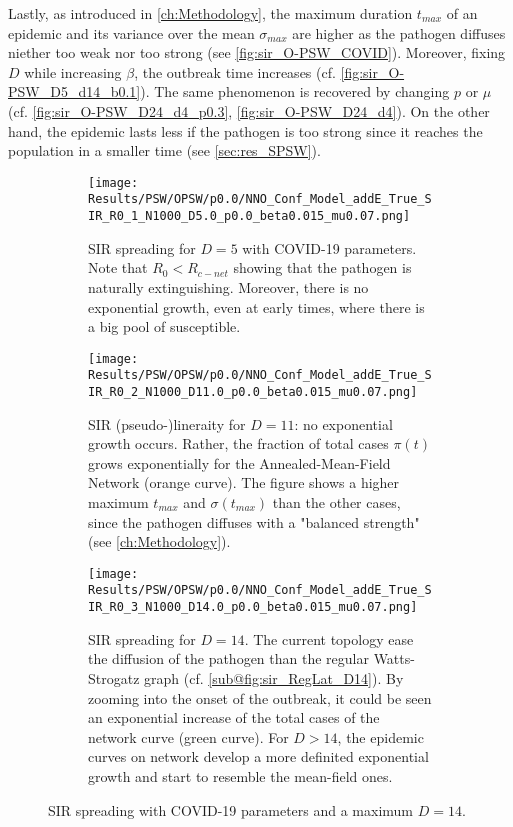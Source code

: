 \documentclass[a4paper,10pt,twoside]{book} %
\theoremstyle{definition}
\begin{document}
Lastly, as introduced in \autoref{ch:Methodology}, the maximum duration $t_{max}$ of an epidemic and its variance over the mean $\sigma_{max}$ are higher as the pathogen diffuses niether too weak nor too strong (see \autoref{fig:sir_O-PSW_COVID}). Moreover, fixing $D$ while increasing $ \beta$, the outbreak time increases (cf. \autoref{fig:sir_O-PSW_D5_d14_b0.1}). The same phenomenon is recovered by changing $ p$ or $ \mu$  (cf. \autoref{fig:sir_O-PSW_D24_d4_p0.3}, \autoref{fig:sir_O-PSW_D24_d4}). 
On the other hand, the epidemic lasts less if the pathogen is too strong since it reaches the population in a smaller time (see \autoref{sec:res_SPSW}).

\begin{figure}[p]
	\centering
    \begin{subfigure}[t]{\linewidth}
        \texttt{[image: Results/PSW/OPSW/p0.0/NNO\_Conf\_Model\_addE\_True\_SIR\_R0\_1\_N1000\_D5.0\_p0.0\_beta0.015\_mu0.07.png]}
		\centering
        \caption{SIR spreading for $D = 5$ with COVID-19 parameters. Note that $R_0 < R_{c-net}$ showing that the pathogen is naturally extinguishing. Moreover, there is no exponential growth, even at early times, where there is a big pool of susceptible.}
        \label{fig:sir_O-PSW_D5_p0}
    \end{subfigure}
	\vfill
	\begin{subfigure}[b]{\linewidth}
		\centering
        \texttt{[image: Results/PSW/OPSW/p0.0/NNO\_Conf\_Model\_addE\_True\_SIR\_R0\_2\_N1000\_D11.0\_p0.0\_beta0.015\_mu0.07.png]}
        \caption{SIR (pseudo-)lineraity for $D = 11$: no exponential growth occurs. Rather, the fraction of total cases $\pi(t)$ grows exponentially for the Annealed-Mean-Field Network (orange curve).
		The figure shows a higher maximum $ t_{max}$ and $ \sigma(t_{max})$ than the other cases, since the pathogen diffuses with a "balanced strength" (see \autoref{ch:Methodology}).}
        \label{fig:sir_O-PSW_D11_p0}
    \end{subfigure}
	\vfill
	\begin{subfigure}[b]{\linewidth}
		\centering
        \texttt{[image: Results/PSW/OPSW/p0.0/NNO\_Conf\_Model\_addE\_True\_SIR\_R0\_3\_N1000\_D14.0\_p0.0\_beta0.015\_mu0.07.png]}
        \caption{SIR spreading for $D = 14$. The current topology ease the diffusion of the pathogen than the regular Watts-Strogatz graph (cf. \autoref{sub@fig:sir_RegLat_D14}). By zooming into the onset of the outbreak, it could be seen an exponential increase of the total cases of the network curve (green curve). For $D > 14$, the epidemic curves on network develop a more definited exponential growth and start to resemble the mean-field ones.}
        \label{fig:sir_O-PSW_D14_p0}
    \end{subfigure}
	\caption{SIR spreading with COVID-19 parameters and a maximum $D = 14$.}
	\label{fig:sir_O-PSW_COVID}
\end{figure}
\end{document}
